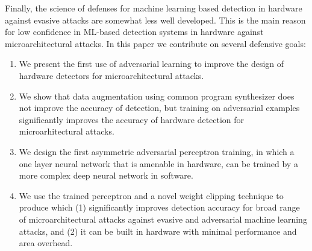  
 
Finally, the science of defenses for machine learning based  detection in hardware against evasive attacks are somewhat less well developed. This is the main reason for low confidence in ML-based detection systems in hardware against microarchitectural attacks. In this paper we contribute on several defensive goals:

\begin{enumerate}
\item We present the first use of adversarial learning to improve the
design of hardware detectors for microarchitectural attacks. 
\vspace{2mm}

\item We show that data augmentation using common program synthesizer does not improve the accuracy of detection, but training on adversarial examples significantly improves the accuracy of hardware detection for microarhitectural attacks. 

\item We design the first asymmetric  adversarial perceptron training, in which a one layer neural network that is amenable in hardware, can be trained by a more complex deep neural network in software.
\vspace{2mm}

\item We use the trained perceptron and a novel weight clipping technique to produce \scheme{} which (1) significantly improves detection accuracy for broad range of microarchitectural attacks against evasive and adversarial machine learning attacks, and (2) it can be built in hardware with minimal performance and area overhead. 
\end{enumerate}
